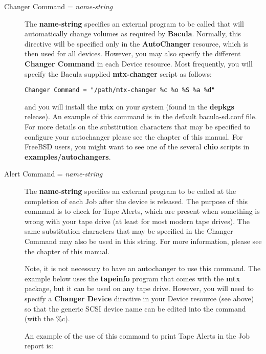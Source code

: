 \begin{description}
\item [Changer Command = {\it name-string}]
   The {\bf name-string} specifies an external program to be called  that will
   automatically change volumes as required by {\bf Bacula}.  Normally,
   this directive will be specified only in the {\bf AutoChanger} resource,
   which is then used for all devices.  However, you may also specify
   the different {\bf Changer Command} in each Device resource.
   Most frequently,
   you will specify the Bacula supplied {\bf mtx-changer}  script as follows:  

\footnotesize
\begin{verbatim}
Changer Command = "/path/mtx-changer %c %o %S %a %d"
\end{verbatim}
\normalsize

   and you will install the {\bf mtx} on your system (found  in the {\bf depkgs}
   release). An example of this command is in the default bacula-sd.conf file. 
   For more details on the substitution characters that may be specified  to
   configure your autochanger please see  the 
    chapter of this  manual.
   For FreeBSD users, you might want to see one of the  several {\bf chio}
   scripts in {\bf examples/autochangers}.  

\item [Alert Command = {\it name-string}]
   The {\bf name-string} specifies an external program to be called at the
   completion of each Job after the device is released.  The purpose of this
   command is to check for Tape Alerts, which are present when something is
   wrong with your tape drive (at least for most modern tape drives).  The same
   substitution characters that may be specified in the Changer Command may
   also be used in this string.  For more information, please see the
    chapter of this manual.
   
   
   Note, it is not necessary to have an autochanger to use this command. The
   example below uses the {\bf tapeinfo} program that comes with the {\bf mtx}
   package, but it can be used on any tape drive. However, you will need to
   specify a {\bf Changer Device} directive in your Device resource (see above)
   so that the generic SCSI device name can be edited into the command (with
   the \%c).
   
   An example of the use of this command to print Tape Alerts  in the Job report
   is:  


\end{description}
